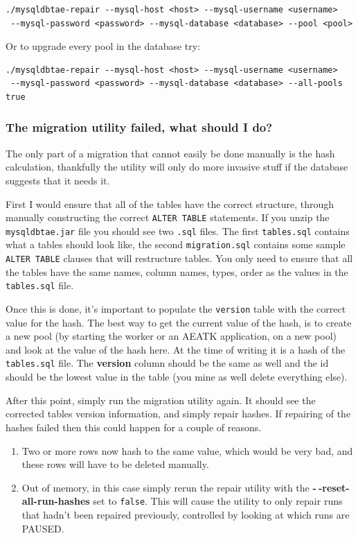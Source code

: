 \documentclass[11pt,letterpaper,oneside]{article}
\begin{document}
\begin{verbatim}
./mysqldbtae-repair --mysql-host <host> --mysql-username <username>
 --mysql-password <password> --mysql-database <database> --pool <pool>
\end{verbatim}

Or to upgrade every pool in the database try:

\begin{verbatim}
./mysqldbtae-repair --mysql-host <host> --mysql-username <username>
 --mysql-password <password> --mysql-database <database> --all-pools true
\end{verbatim}


\subsubsection{The migration utility failed, what should I do?}

The only part of a migration that cannot easily be done manually is the hash calculation, thankfully the utility will only do more invasive stuff if the database suggests that it needs it.

First I would ensure that all of the tables have the correct structure, through manually constructing the correct \texttt{ALTER TABLE} statements. If you unzip the \texttt{mysqldbtae.jar} file you should see two \texttt{.sql} files. The first \texttt{tables.sql} contains what a tables should look like, the second \texttt{migration.sql} contains some sample \texttt{ALTER TABLE} clauses that will restructure tables. You only need to ensure that all the tables have the same names, column names, types, order as the values in the \texttt{tables.sql} file.  

Once this is done, it's important to populate the \texttt{version} table with the correct value for the hash. The best way to get the current value of the hash, is to create a new pool (by starting the worker or an AEATK application, on a new pool) and look at the value of the hash here. At the time of writing it is a hash of the \texttt{tables.sql} file. The \textbf{version} column should be the same as well and the id should be the lowest value in the table (you mine as well delete everything else). 

After this point, simply run the migration utility again. It should see the corrected tables version information, and simply repair hashes. If repairing of the hashes failed then this could happen for a couple of reasons.

\begin{enumerate}
\item Two or more rows now hash to the same value, which would be very bad, and these rows will have to be deleted manually. 
\item Out of memory, in this case simply rerun the repair utility with the \textbf{-$~\!$-reset-all-run-hashes} set to \texttt{false}. This will cause the utility to only repair runs that hadn't been repaired previously, controlled by looking at which runs are PAUSED.
\end{enumerate}
\end{document}
